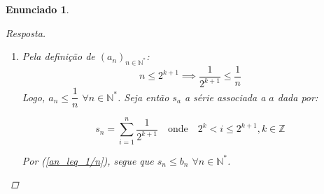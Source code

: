 \documentclass[a4paper,twoside,11pt]{article}
\newtheorem*{enunciado}{Enunciado}
\begin{document}
\begin{enunciado}
\begin{proof}[Resposta]
\begin{enumerate}[label=(\alph*)]
            Mas se $a, b \in \mathbb{Z}$, segue que:
            \begin{enumerate}[label=\arabic*.]
                \item Se $a = b$, então $2^{b-a} = 1$;
                \item Se $a > b$, então $b - a \leq -1 \implies b - a = -1 - k, k \in \mathbb{Z}_{>0}$, e $2^{-1-k} = \frac{1}{2^{k+1}} < 1$;
                \item Se $a < b$, então $b - a \geq 1 \implies b - a = 1 + k, k \in \mathbb{Z}_{>0}$, e $2^{1+k} = 2.2^k > 2$.
            \end{enumerate}
            
            De todo modo, $1 \geq 2^{b-a}$ ou $2^{b-a} > 2$. \Lightning $a$ não é crescente $\implies a$ é não crescente. \qed

            $(b_n)_{n \in \mathbb{N}}$ é crescente se e somente se:
            
            \begin{align*}
                b_{n+1} > b_n &\iff \sum_{k=1}^{n+1} \dfrac{1}{k} > \sum_{k=1}^n \dfrac{1}{k}\\
                &\iff \sum_{k=1}^n \dfrac{1}{k} + \dfrac{1}{n+1} > \sum_{k=1}^n \dfrac{1}{k}
            \end{align*}

            De fato, como $n \in \mathbb{N}^*$, evidentemente $n + 1 \in \mathbb{N}^*$ e, assim, $\dfrac{1}{n+1} > 0$.
            Portanto, segue que $b_{n+1} > b_n$ e assim que $b$ é crescente. \qed

            \item Pela definição de $(a_n)_{n \in \mathbb{N}^*}$:
            \begin{equation}\tag{1}\label{an_leq_1/n}
                n \leq 2^{k + 1} \implies \dfrac{1}{2^{k+1}} \leq \dfrac{1}{n}
            \end{equation}
            Logo, $a_n \leq \dfrac{1}{n}$ $\forall n \in \mathbb{N}^*$.
            Seja então $s_a$ a série associada a $a$ dada por:

            \begin{equation}\tag{2}\label{series}
                s_n = \sum^n_{i=1}\dfrac{1}{2^{k+1}} \quad \text{onde} \quad 2^k < i \leq 2^{k+1}, k \in \mathbb{Z}
            \end{equation}

            Por (\ref{an_leq_1/n}), segue que $s_n \leq b_n$ $\forall n \in \mathbb{N}^*$.


\end{enumerate}
\end{proof}
\end{enunciado}
\end{document}
